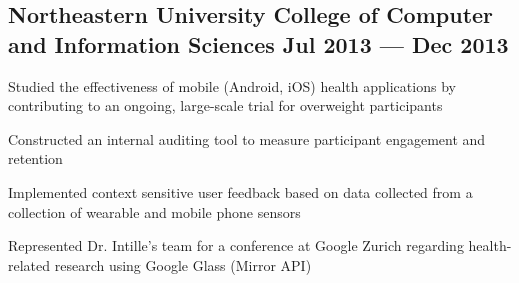 

\subsection{{Northeastern University College of Computer and Information Sciences \hfill Jul 2013 --- Dec 2013}}
\begin{zitemize}
\item Studied the effectiveness of mobile (Android, iOS) health applications by contributing to an ongoing, large-scale trial for overweight participants
\item Constructed an internal auditing tool to measure participant engagement and retention
\item Implemented context sensitive user feedback based on data collected from a collection of wearable and mobile phone sensors
\item Represented Dr. Intille's team for a conference at Google Zurich regarding health-related research using Google Glass (Mirror API)
\end{zitemize}
